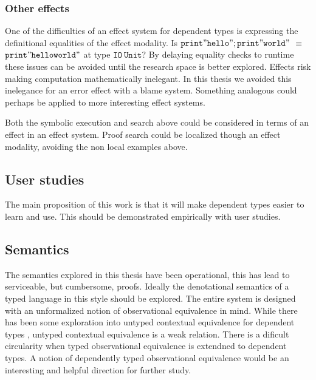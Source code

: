\subsubsection{Other effects}

One of the difficulties of an effect system for dependent types is expressing the definitional equalities of the effect modality.
Is $\mathtt{print"hello";print"world"}$ $\equiv$ $\mathtt{print"helloworld"}$ at type $\mathtt{IO\ Unit}$?
By delaying equality checks to runtime these issues can be avoided until the research space is better explored.
Effects risk making computation mathematically inelegant.
In this thesis we avoided this inelegance for an error effect with a blame system.
Something analogous could perhaps be applied to more interesting effect systems.

Both the symbolic execution and search above could be considered in terms of an effect in an effect system.
Proof search could be localized though an effect modality, avoiding the non local examples above.

\subsection{User studies}

The main proposition of this work is that it will make dependent types easier to learn and use.
This should be demonstrated empirically with user studies.

\subsection{Semantics}

The semantics explored in this thesis have been operational, this has lead to serviceable, but cumbersome, proofs.
Ideally the denotational semantics of a typed language in this style should be explored.
The entire system is designed with an unformalized notion of observational equivalence in mind.
While there has been some exploration into untyped contextual equivalence for dependent types \cite{sjoberg2015dependently,jia2010dependent}, untyped contextual equivalence is a weak relation.
There is a dificult circularity when typed observational equivalence is extendned to dependent types.
A notion of dependently typed observational equivalence would be an interesting and helpful direction for further study.
